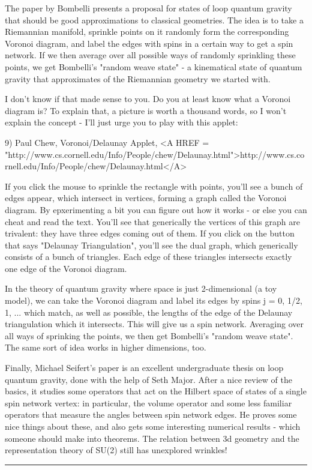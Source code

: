 The paper by Bombelli presents a proposal for states of loop quantum
gravity that should be good approximations to classical geometries.  The
idea is to take a Riemannian manifold, sprinkle points on it randomly
form the corresponding Voronoi diagram, and label the edges with spins
in a certain way to get a spin network.  If we then average over all
possible ways of randomly sprinkling these points, we get Bombelli's
"random weave state" - a kinematical state of quantum gravity that
approximates of the Riemannian geometry we started with.

I don't know if that made sense to you.  Do you at least know what a
Voronoi diagram is?  To explain that, a picture is worth a thousand
words, so I won't explain the concept - I'll just urge you to play 
with this applet:

9) Paul Chew, Voronoi/Delaunay Applet, 
<A HREF = "http://www.cs.cornell.edu/Info/People/chew/Delaunay.html">http://www.cs.cornell.edu/Info/People/chew/Delaunay.html</A>

If you click the mouse to sprinkle the rectangle with points, you'll see
a bunch of edges appear, which intersect in vertices, forming a graph
called the Voronoi diagram.  By epxerimenting a bit you can figure out
how it works - or else you can cheat and read the text.  You'll see that
generically the vertices of this graph are trivalent: they have three
edges coming out of them.  If you click on the button that says
"Delaunay Triangulation", you'll see the dual graph, which
generically consists of a bunch of triangles.  Each edge of these
triangles intersects exactly one edge of the Voronoi diagram.

In the theory of quantum gravity where space is just 2-dimensional (a
toy model), we can take the Voronoi diagram and label its edges by spins
j = 0, 1/2, 1, ... which match, as well as possible, the lengths of the
edge of the Delaunay triangulation which it intersects.  This will give
us a spin network.  Averaging over all ways of sprinking the points, we
then get Bombelli's "random weave state".  The same sort of idea works
in higher dimensions, too.

Finally, Michael Seifert's paper is an excellent undergraduate thesis on
loop quantum gravity, done with the help of Seth Major.  After a nice
review of the basics, it studies some operators that act on the Hilbert
space of states of a single spin network vertex: in particular, the
volume operator and some less familiar operators that measure the angles
between spin network edges.  He proves some nice things about these, and
also gets some interesting numerical results - which someone should make
into theorems.  The relation between 3d geometry and the representation
theory of SU(2) still has unexplored wrinkles!







 \par\noindent\rule{\textwidth}{0.4pt}

